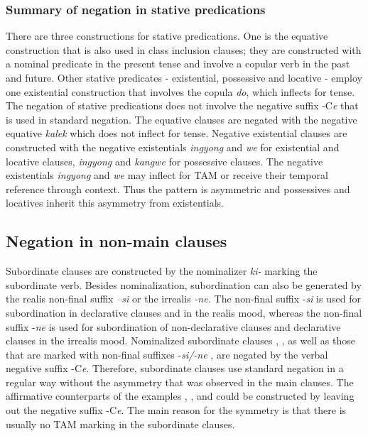 \documentclass[output=paper,colorlinks,citecolor=brown]{langscibook}
\begin{document}
\subsubsection{Summary of negation in stative predications}\label{sec:amr:2.3.6}
There are three constructions for stative predications. One is the equative construction that is also used in class inclusion clauses; they are constructed with a nominal predicate in the present tense and involve a copular verb in the past and future. Other stative predicates - existential, possessive and locative - employ one existential construction that involves the copula \textit{do}, which inflects for tense. The negation of stative predications does not involve the negative suffix -C\textit{e} that is used in standard negation. The equative clauses are negated with the negative equative \textit{kalek} which does not inflect for tense. Negative existential clauses are constructed with the negative existentials \textit{ingyong} and \textit{we} for existential and locative clauses, \textit{ingyong} and \textit{kangwe} for possessive clauses. The negative existentials \textit{ingyong} and \textit{we} may inflect for TAM or receive their temporal reference through context. Thus the pattern is asymmetric and possessives and locatives inherit this asymmetry from existentials.

\subsection{Negation in non-main clauses} \label{sec:amr:2.4}
Subordinate clauses are constructed by the nominalizer \textit{ki-} marking the subordinate verb. Besides nominalization, subordination can also be generated by the realis non-final suffix \textit{–si} or the irrealis \textit{{}-ne.} The non-final suffix -\textit{si} is used for subordination in declarative clauses and in the realis mood, whereas the non-final suffix -\textit{ne} is used for subordination of non-declarative clauses and declarative clauses in the irrealis mood. Nominalized subordinate clauses , , as well as those that are marked with non-final suffixes -\textit{si/-ne} , are negated by the verbal negative suffix {}-C\textit{e}. Therefore, subordinate clauses use standard negation in a regular way without the asymmetry that was observed in the main clauses. The affirmative counterparts of the examples , , and  could be constructed by leaving out the negative suffix -C\textit{e}. The main reason for the symmetry is that there is usually no TAM marking in the subordinate clauses. 
\end{document}
